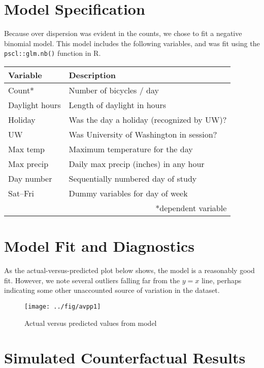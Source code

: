 \documentclass[final]{beamer}
\begin{document}
\begin{frame}[t]
\begin{multicols}{3}
\section{Model Specification}
Because over dispersion was evident in the counts, we chose to fit a
negative binomial model. This model includes the following variables,
and was fit using the \texttt{pscl::glm.nb()} function in R.

\begin{table}[htdp]
\begin{center}
\begin{tabular}{ll}
  \hline\hline
  Variable & Description \\
  \hline
  Count* & Number of bicycles / day \\
  Daylight hours & Length of daylight in hours \\
  Holiday & Was the day a holiday (recognized by UW)? \\
  UW & Was University of Washington in session? \\
  Max temp & Maximum temperature for the day \\
  Max precip & Daily max precip (inches) in any hour \\
  Day number & Sequentially numbered day of study \\
  Sat--Fri & Dummy variables for day of week \\
  \hline\hline
    & \multicolumn{1}{r}{*dependent variable}
\end{tabular}
\end{center}
\label{default}
\end{table}%

\section{Model Fit and Diagnostics}

As the actual-versus-predicted plot below shows, the model is a
reasonably good fit. However, we note several outliers falling far
from the $y=x$ line, perhaps indicating some other unaccounted source
of variation in the dataset.

\begin{figure}[htbp]
\begin{center}
\texttt{[image: ../fig/avpp1]}
\caption{Actual versus predicted values from model}
\label{fg:avp}
\end{center}
\end{figure}

\section{Simulated Counterfactual Results}


\end{multicols}
\end{frame}
\end{document}
